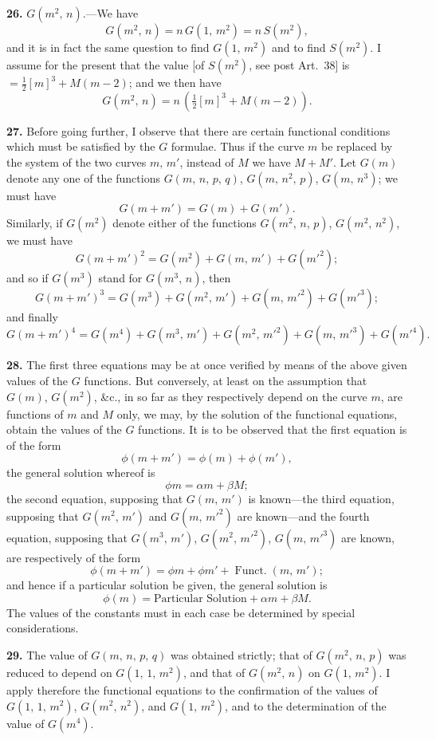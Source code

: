 \documentclass[11pt,a4paper]{article}
\providecommand{\Funct}{\operatorname{Funct.}}
\begin{document}
\medskip

\textbf{26.} $G(m^2,\,n)$.---We have
\[
G(m^2,\,n) = n\,G(1,\,m^2) = n\,S(m^2),
\]
and it is in fact the same question to find $G(1,\,m^2)$ and to find $S(m^2)$. I assume for the present that the value [of $S(m^2)$, see post Art.~38] is $= \tfrac{1}{2}[m]^3 + M(m-2)$; and we then have
\[
G(m^2,\,n) = n\,(\tfrac{1}{2}[m]^3 + M(m-2)).
\]

\medskip

\textbf{27.} Before going further, I observe that there are certain functional conditions which must be satisfied by the $G$ formulae. Thus if the curve $m$ be replaced by the system of the two curves $m,\,m'$, instead of $M$ we have $M + M'$. Let $G(m)$ denote any one of the functions $G(m,\,n,\,p,\,q)$, $G(m,\,n^2,\,p)$, $G(m,\,n^3)$; we must have
\[
G(m+m') = G(m) + G(m').
\]
Similarly, if $G(m^2)$ denote either of the functions $G(m^2,\,n,\,p)$, $G(m^2,\,n^2)$, we must have
\[
G(m+m')^2 = G(m^2) + G(m,\,m') + G(m'^2);
\]
and so if $G(m^3)$ stand for $G(m^3,\,n)$, then
\[
G(m+m')^3 = G(m^3) + G(m^2,\,m') + G(m,\,m'^2) + G(m'^3);
\]
and finally
\[
G(m+m')^4 = G(m^4) + G(m^3,\,m') + G(m^2,\,m'^2) + G(m,\,m'^3) + G(m'^4).
\]

\medskip

\textbf{28.} The first three equations may be at once verified by means of the above given values of the $G$ functions. But conversely, at least on the assumption that $G(m)$, $G(m^2)$, \&c., in so far as they respectively depend on the curve $m$, are functions of $m$ and $M$ only, we may, by the solution of the functional equations, obtain the values of the $G$ functions. It is to be observed that the first equation is of the form
\[
\phi(m+m') = \phi(m) + \phi(m'),
\]
the general solution whereof is
\[
\phi m = \alpha m + \beta M;
\]
the second equation, supposing that $G(m,\,m')$ is known---the third equation, supposing that $G(m^2,\,m')$ and $G(m,\,m'^2)$ are known---and the fourth equation, supposing that $G(m^3,\,m')$, $G(m^2,\,m'^2)$, $G(m,\,m'^3)$ are known, are respectively of the form
\[
\phi(m+m') = \phi m + \phi m' + \Funct(m,\,m');
\]
and hence if a particular solution be given, the general solution is
\[
\phi(m) = \text{Particular Solution} + \alpha m + \beta M.
\]
The values of the constants must in each case be determined by special considerations.

\medskip

\textbf{29.} The value of $G(m,\,n,\,p,\,q)$ was obtained strictly; that of $G(m^2,\,n,\,p)$ was reduced to depend on $G(1,\,1,\,m^2)$, and that of $G(m^2,\,n)$ on $G(1,\,m^2)$. I apply therefore the functional equations to the confirmation of the values of $G(1,\,1,\,m^2)$, $G(m^2,\,n^2)$, and $G(1,\,m^2)$, and to the determination of the value of $G(m^4)$.
\end{document}
